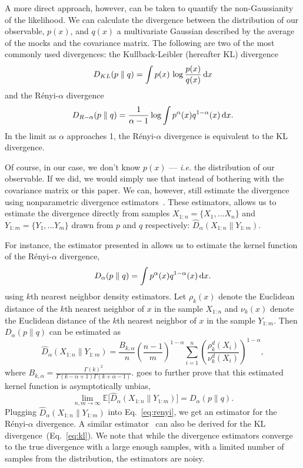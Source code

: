 \documentclass[12pt, letterpaper, preprint]{aastex}
\newcommand{\beq}{\begin{equation}}
\newcommand{\eeq}{\end{equation}}
\begin{document}
A more direct approach, however, can be taken to quantify the 
non-Gaussianity of the likelihood. We can calculate the divergence between 
the distribution of our observable, $p(x)$, and $q(x)$ a multivariate Gaussian described 
by the average of the mocks and the covariance matrix.
The following are two of the most commonly used divergences: 
the Kullback-Leibler (hereafter KL) divergence
\beq \label{eq:kl} 
D_{KL} ( p \parallel q ) = \int p(x)\,\log \frac{p(x)}{q(x)}\,{\rm d}x
\eeq
and the R\'enyi-$\alpha$ divergence
\beq \label{eq:renyi}
D_{R-\alpha} ( p \parallel q ) = \frac{1}{\alpha -1} \log \int p^\alpha(x) q^{1 -\alpha}(x)\,{\rm d}x. 
\eeq
In the limit as $\alpha$ approaches 1, the R\'enyi-$\alpha$ divergence is
equivalent to the KL divergence.

Of course, in our case, we don't know $p(x)$ --- \emph{i.e.} the distribution of
our observable. If we did, we would simply use that instead of bothering with 
the covariance matrix or this paper. We can, however, still estimate the 
divergence using nonparametric divergence estimators~\citep{wang2009, poczos2012, krishnamurthy2014}. 
These estimators, allows us to estimate the divergence directly from 
samples $X_{1:n} = \{ X_1, ... X_n \}$ and $Y_{1:m} = \{ Y_1, ... Y_m \}$ 
drawn from $p$ and $q$ respectively: $\hat{D}_{\alpha}(X_{1:n} \parallel Y_{1:m})$. 

For instance, the estimator presented in \cite{poczos2012} allows us to estimate the kernel function 
of the R\'enyi-$\alpha$ divergence,
\beq \label{eq:d_alpha}
D_{\alpha} ( p \parallel q ) = \int p^\alpha(x) q^{1-\alpha}(x)\,{\rm d}x. 
\eeq
using $k$th nearest neighbor density estimators.
Let $\rho_k(x)$ denote the Euclidean distance of the $k$th nearest neighbor 
of $x$ in the sample $X_{1:n}$ and $\nu_k(x)$ denote the Euclidean distance 
of the $k$th nearest neighbor of $x$ in the sample $Y_{1:m}$. Then 
$D_{\alpha}(p \parallel q)$ can be estimated as 
\beq \label{eq:d_alpha_est}
\hat{D}_{\alpha}(X_{1:n} \parallel Y_{1:m}) = \frac{B_{k,\alpha}}{n} \left(\frac{n-1}{m}\right)^{1-\alpha}
\sum\limits_{i=1}^{n} \left(\frac{\rho_k^{d}(X_i)}{\nu_k^{d}(X_i)} \right)^{1-\alpha},
\eeq
where $B_{k, \alpha} = \frac{\Gamma(k)^2}{\Gamma(k-\alpha+1)\Gamma(k+\alpha-1)}$. 
\cite{poczos2012} goes to further prove that this estimated kernel function
is asymptotically unbias,
\beq
\lim_{n, m \rightarrow \infty} \mathbb{E} \big[ \hat{D}_{\alpha} (X_{1:n} \parallel Y_{1:m}) \big] = D_{\alpha} (p \parallel q).
\eeq
Plugging $\hat{D}_{\alpha}(X_{1:n} \parallel Y_{1:m})$ into Eq.~\ref{eq:renyi},
we get an estimator for the R\'enyi-$\alpha$ divergence. A similar estimator~\citep{wang2009} 
can also be derived for the KL divergence~(Eq.~\ref{eq:kl}). 
We note that while the divergence estimators converge to the true divergence with a large
enough samples, with a limited number of samples from the distribution, 
the estimators are noisy. 
\end{document}
